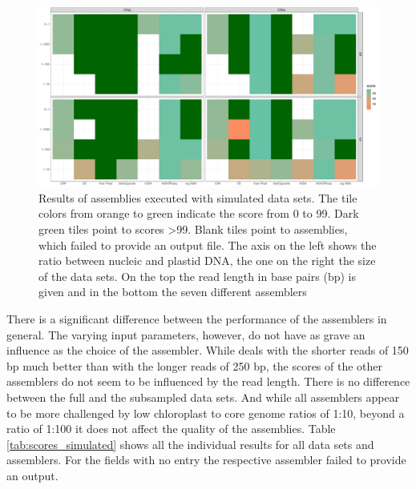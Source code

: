 \begin{figure}[H]
\centering
\includegraphics[height=.55\textheight, width=.99\textwidth]{Figures/sim_tiles}
\decoRule
\caption[Score of assemblies of simulated data sets]{Results of assemblies executed with
  simulated data sets. The tile colors from orange to green indicate the score from 0 to
  99. Dark green tiles point to scores >99. Blank tiles point to assemblies, which failed to
  provide an output file. The axis on the left shows the ratio between nucleic and
  plastid DNA, the one on the right the size of the data sets. On the top the read length
  in base pairs (bp) is given and in the bottom the seven different assemblers}
\label{fig:sim_tiles}
\end{figure}

There is a significant difference between the performance of the assemblers in general.
The varying input parameters, however, do not have as grave an influence as the choice of
the assembler. While \fp \hspace{0.25ex} deals with the shorter reads of 150 bp much better
than with the longer reads of 250 bp, the scores of the other assemblers do not seem to be
influenced by the read length. There is no difference between the full and the subsampled
data sets. And while all assemblers appear to be more challenged by low chloroplast to
core genome ratios of 1:10, beyond a ratio of 1:100 it does not affect the quality of the
assemblies. Table \ref{tab:scores_simulated} shows all the individual results for all data
sets and assemblers. For the fields with no entry the respective assembler failed to
provide an output.

